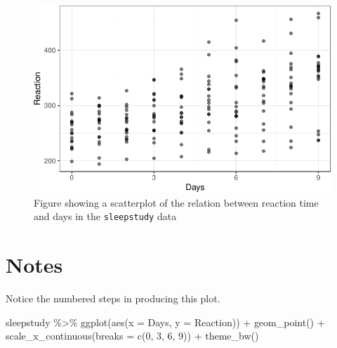 \documentclass[
  letterpaper,
  DIV=11,
  numbers=noendperiod]{scrreprt}
\newenvironment{Shaded}{\begin{snugshade}}{\end{snugshade}}
\newcommand{\AttributeTok}[1]{\textcolor[rgb]{0.40,0.45,0.13}{#1}}
\newcommand{\DecValTok}[1]{\textcolor[rgb]{0.68,0.00,0.00}{#1}}
\newcommand{\FunctionTok}[1]{\textcolor[rgb]{0.28,0.35,0.67}{#1}}
\newcommand{\NormalTok}[1]{\textcolor[rgb]{0.00,0.23,0.31}{#1}}
\newcommand{\SpecialCharTok}[1]{\textcolor[rgb]{0.37,0.37,0.37}{#1}}
\begin{document}
\begin{figure}[H]

{\centering \includegraphics{visualization_files/figure-pdf/fig-sleep-study-scatterplot-all-1.pdf}

}

\caption{\label{fig-sleep-study-scatterplot-all}Figure showing a
scatterplot of the relation between reaction time and days in the
\texttt{sleepstudy} data}

\end{figure}

\section{Notes}

Notice the numbered steps in producing this plot.

\begin{Shaded}
\begin{Highlighting}[numbers=left,,]
\NormalTok{sleepstudy }\SpecialCharTok{\%\textgreater{}\%} 
  \FunctionTok{ggplot}\NormalTok{(}\FunctionTok{aes}\NormalTok{(}\AttributeTok{x =}\NormalTok{ Days, }\AttributeTok{y =}\NormalTok{ Reaction)) }\SpecialCharTok{+}
  \FunctionTok{geom\_point}\NormalTok{() }\SpecialCharTok{+} 
  \FunctionTok{scale\_x\_continuous}\NormalTok{(}\AttributeTok{breaks =} \FunctionTok{c}\NormalTok{(}\DecValTok{0}\NormalTok{, }\DecValTok{3}\NormalTok{, }\DecValTok{6}\NormalTok{, }\DecValTok{9}\NormalTok{)) }\SpecialCharTok{+}
  \FunctionTok{theme\_bw}\NormalTok{()}
\end{Highlighting}
\end{Shaded}
\end{document}
